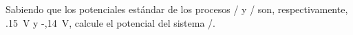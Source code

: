 Sabiendo que los potenciales estándar de los procesos / y / son, respectivamente, \SI{,15}{\volt} y \SI{-,14}{\volt}, calcule el potencial del sistema /.
